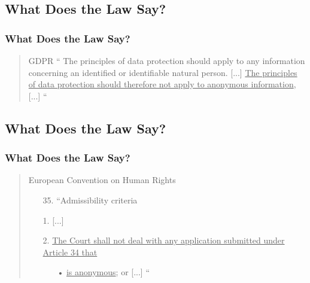 \documentclass[
english,
svgnames,
notes=hide,
12pt]{beamer}
\begin{document}

\begin{frame}
  \section{What Does the Law Say?}
  \pause
  \frametitle{What Does the Law Say?}
	\begin{quote}
    \begin{block}{GDPR}
    ``
  The principles of data protection should apply to any information concerning an
  identified or identifiable natural person. [...]
  \ul{The principles of data protection should therefore not apply to anonymous information}, [...]
  ``
\end{block}
  \end{quote}
\end{frame}

\begin{frame}
  \section{What Does the Law Say?}
  \frametitle{What Does the Law Say?}
  \begin{quote}
    \begin{block}{European Convention on Human Rights}
  \begin{enumerate}
\item[35.] ``Admissibility criteria
\end{enumerate}
  \begin{enumerate}
    \item[1.] [...]
    \item[2.] \ul{The Court shall not deal with any application submitted under Article 34 that}
    \begin{enumerate}
      \item[•] \ul{is anonymous}; or [...]
        ``
    \end{enumerate}
  \end{enumerate}
\end{block}
  \end{quote}
\end{frame}
\end{document}
